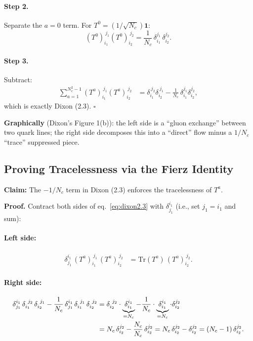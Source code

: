 \paragraph{Step 2.} Separate the $a=0$ term. For $T^0=(1/\sqrt{N_c})\mathbf{1}$:
\begin{equation}
  (T^0)_{i_1}^{\ j_1}(T^0)_{i_2}^{\ j_2}
  = \frac{1}{N_c}\,\delta_{i_1}^{j_1}\,\delta_{i_2}^{j_2}.
\end{equation}

\paragraph{Step 3.} Subtract:
\begin{align}
  \sum_{a=1}^{N_c^2-1}(T^a)_{i_1}^{\ j_1}(T^a)_{i_2}^{\ j_2}
  &= \delta_{i_1}^{\ j_2}\delta_{i_2}^{\ j_1}
   - \frac{1}{N_c}\,\delta_{i_1}^{j_1}\delta_{i_2}^{j_2},
\end{align}
which is exactly Dixon (2.3). $\square$

\textbf{Graphically} (Dixon's Figure 1(b)): the left side is a ``gluon exchange''
between two quark lines; the right side decomposes this into a ``direct'' flow
minus a $1/N_c$ ``trace'' suppressed piece.

\subsection{Proving Tracelessness via the Fierz Identity}
\label{sec:trace-fierz}

\textbf{Claim:} The $-1/N_c$ term in Dixon (2.3) enforces the tracelessness of $T^a$.

\textbf{Proof.} Contract both sides of eq.~\eqref{eq:dixon2.3} with $\delta^{i_1}_{j_1}$
(i.e., set $j_1=i_1$ and sum):

\paragraph{Left side:}
\begin{align}
  \delta^{i_1}_{j_1}\,(T^a)_{i_1}^{\ j_1}\,(T^a)_{i_2}^{\ j_2}
  &= \mathrm{Tr}(T^a)\,(T^a)_{i_2}^{\ j_2}.
\end{align}

\paragraph{Right side:}
\begin{align}
  \delta^{i_1}_{j_1}\,\delta_{i_1}^{\ j_2}\,\delta_{i_2}^{\ j_1}
  - \frac{1}{N_c}\,\delta^{i_1}_{j_1}\,\delta_{i_1}^{\ j_1}\,\delta_{i_2}^{\ j_2}
  &= \delta_{i_2}^{\ j_2}\cdot\underbrace{\delta^{i_1}_{i_1}}_{=N_c}
   - \frac{1}{N_c}\cdot\underbrace{\delta^{i_1}_{i_1}}_{=N_c}\cdot\delta_{i_2}^{j_2}
  \notag\\
  &= N_c\,\delta_{i_2}^{j_2} - \frac{N_c}{N_c}\,\delta_{i_2}^{j_2}
   = N_c\,\delta_{i_2}^{j_2} - \delta_{i_2}^{j_2}
   = (N_c-1)\,\delta_{i_2}^{j_2}.
\end{align}

